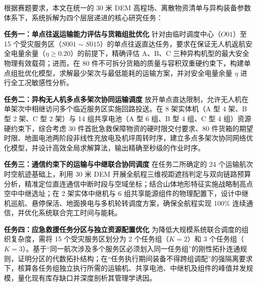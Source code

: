 根据赛题要求，本文在统一的 30 米 DEM 高程场、离散物资清单与异构装备参数体系下，系统拆解为四个层层递进的核心研究任务：

\textbf{任务一：单点往返运输能力评估与货箱组批优化}
针对由临时调度中心（$O01$）至 15 个受灾服务区（$S001 \sim S015$）的单点往返直达任务，要求在保证无人机返航安全电量余量（$\eta \ge 0.20$）的前提下，精确评估 A、B、C 三种异构机型的最大安全物理有效载荷；进而，在 80 件不可拆分货箱的质量与容积双重硬约束下，构建单点组批优化模型，求解最少架次与最低能耗的运输方案，并对安全电量余量 $\eta$ 进行全工况敏感性分析。

\textbf{任务二：异构无人机多点多架次协同运输调度}
放开单点直达限制，允许无人机在单架次中相继访问多个临近服务区实施回路投送。在 8 架实体机（A 型 4 架、B 型 2 架、C 型 2 架）与 14 组共享电池（A 型 6 组、B 型 4 组、C 型 4 组）资源硬约束下，综合考虑 30 件首批急救保障物资的硬时限交付要求、80 件货箱的期望时限、地面电池两阶段非线性充放电及机坪周转时序，建立多点多架次协同网络优化模型，并设计高效全局求解算法，输出精确至秒级的作业时序。

\textbf{任务三：通信约束下的运输与中继联合协同调度}
在任务二所确定的 24 个运输航次时空航迹基础上，利用 30 米 DEM 开展全航程三维视距遮挡判定与双向链路预算分析，精准定位直连通信中断时段与空域坐标；结合山体地形特征实施战略制高点空中中继选址；在 2 架实体中继机与 6 组共享能源组件的物理配置下，设计中继机巡航、悬停保活、地面换电与多机轮转调度方案，确保全航程实现 100\% 连续通信，并优化系统联合完工时间与能耗。

\textbf{任务四：应急救援任务分区与独立资源配置优化}
为降低大规模系统联合调度的组织复杂度，需将 15 个受灾服务区划分为 2 个任务组（$K=2$）和 3 个任务组（$K=3$）。基于“同一航次涉及多个服务区必须划入同一任务组”的刚性拓扑连通规则，证明分区的代数拓扑结构；在“任务执行期间装备不得跨组调配”的强隔离要求下，核算各任务组独立执行所需的运输机、共享电池、中继机及组件的峰值并发规模，量化现有库存缺口并深度剖析其管理学诱因。
